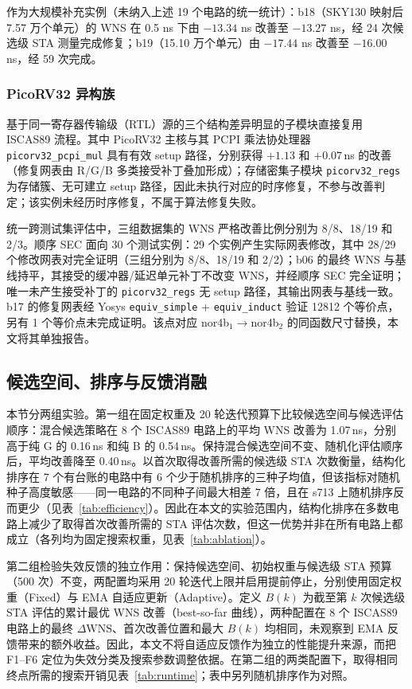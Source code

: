 \documentclass[twocolumn,10pt,fontset=windows]{ctexart}
\begin{document}
作为大规模补充实例（未纳入上述 19 个电路的统一统计）：b18（SKY130 映射后 7.57 万个单元）的 WNS 在 0.5 ns 下由 $-13.34$ ns 改善至 $-13.27$ ns，经 24 次候选级 STA 测量完成修复；b19（15.10 万个单元）由 $-17.44$ ns 改善至 $-16.00$ ns，经 59 次完成。

\subsubsection{PicoRV32 异构族}

基于同一寄存器传输级（RTL）源的三个结构差异明显的子模块直接复用 ISCAS89 流程。其中 PicoRV32 主核与其 PCPI 乘法协处理器 \texttt{picorv32\_pcpi\_mul} 具有有效 setup 路径，分别获得 $+1.13$ 和 $+0.07\,$ns 的改善（修复网表由 R/G/B 多类接受补丁叠加形成）；存储密集子模块 \texttt{picorv32\_regs} 为存储簇、无可建立 setup 路径，因此未执行对应的时序修复，不参与改善判定；该实例未经历时序修复，不属于算法修复失败。

统一跨测试集评估中，三组数据集的 WNS 严格改善比例分别为 8/8、18/19 和 2/3。顺序 SEC 面向 30 个测试实例：29 个实例产生实际网表修改，其中 28/29 个修改网表对完全证明（三组分别为 8/8、18/19 和 2/2）；b06 的最终 WNS 与基线持平，其接受的缓冲器/延迟单元补丁不改变 WNS，并经顺序 SEC 完全证明；唯一未产生接受补丁的 \texttt{picorv32\_regs} 无 setup 路径，其输出网表与基线一致。b17 的修复网表经 Yosys \texttt{equiv\_simple} + \texttt{equiv\_induct} 验证 12812 个等价点，另有 1 个等价点未完成证明。该点对应 nor4b$_1\!\to\!$nor4b$_2$ 的同函数尺寸替换，本文将其单独报告。

\subsection{候选空间、排序与反馈消融}\label{sec:ablation}

本节分两组实验。第一组在固定权重及 20 轮迭代预算下比较候选空间与候选评估顺序：混合候选策略在 8 个 ISCAS89 电路上的平均 WNS 改善为 1.07\,ns，分别高于纯 G 的 0.16\,ns 和纯 B 的 0.54\,ns。保持混合候选空间不变、随机化评估顺序后，平均改善降至 0.40\,ns。以首次取得改善所需的候选级 STA 次数衡量，结构化排序在 7 个有台账的电路中有 6 个少于随机排序的三种子均值，但该指标对随机种子高度敏感——同一电路的不同种子间最大相差 7 倍，且在 s713 上随机排序反而更少（见表~\ref{tab:efficiency}）。因此在本文的实验范围内，结构化排序在多数电路上减少了取得首次改善所需的 STA 评估次数，但这一优势并非在所有电路上都成立（各列均为固定搜索权重，见表~\ref{tab:ablation}）。

第二组检验失效反馈的独立作用：保持候选空间、初始权重与候选级 STA 预算（500 次）不变，两配置均采用 20 轮迭代上限并启用提前停止，分别使用固定权重（Fixed）与 EMA 自适应更新（Adaptive）。定义 $B(k)$ 为截至第 $k$ 次候选级 STA 评估的累计最优 WNS 改善（best-so-far 曲线），两种配置在 8 个 ISCAS89 电路上的最终 $\Delta\mathrm{WNS}$、首次改善位置和最大 $B(k)$ 均相同，未观察到 EMA 反馈带来的额外收益。因此，本文不将自适应反馈作为独立的性能提升来源，而把 F1--F6 定位为失效分类及搜索参数调整依据。在第二组的两类配置下，取得相同终点所需的搜索开销见表~\ref{tab:runtime}；表中另列随机排序作为对照。
\end{document}
